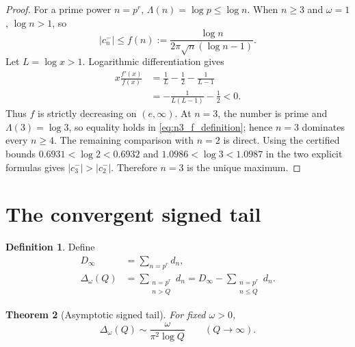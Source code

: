 \documentclass[11pt]{amsart}
\numberwithin{equation}{section}
\theoremstyle{plain}
\newtheorem{theorem}{Theorem}[section]
\theoremstyle{definition}
\newtheorem{definition}[theorem]{Definition}
\theoremstyle{remark}
\newcommand{\1}{\mathbf{1}}
\begin{document}
\begin{proof}
For a prime power \(n=p^r\), \(\Lambda(n)=\log p\leq\log n\).  When
\(n\geq3\) and \(\omega=1\), \(\log n>1\), so
\begin{equation}
|c_n^-|
\leq
f(n)
:=
\frac{\log n}{2\pi\sqrt n(\log n-1)}.
\label{eq:n3_f_definition}
\end{equation}
Let \(L=\log x>1\).  Logarithmic differentiation gives
\begin{align}
x\frac{f'(x)}{f(x)}
&=
\frac1L-\frac12-\frac1{L-1}
\label{eq:n3_log_derivative_one}
\\
&=
-\frac1{L(L-1)}-\frac12<0.
\label{eq:n3_log_derivative_two}
\end{align}
Thus \(f\) is strictly decreasing on \((e,\infty)\).  At \(n=3\), the
number is prime and \(\Lambda(3)=\log3\), so equality holds in
\eqref{eq:n3_f_definition}; hence \(n=3\) dominates every \(n\geq4\).
The remaining comparison with \(n=2\) is direct.  Using the certified
bounds \(0.6931<\log2<0.6932\) and
\(1.0986<\log3<1.0987\) in the two explicit formulas gives
\(|c_3^-|>|c_2^-|\).  Therefore \(n=3\) is the unique maximum.
\end{proof}

\section{The convergent signed tail}
\label{sec:signed_tail}

\begin{definition}
\label{def:Delta}
Define
\begin{align}
D_\infty
&=
\sum_{n=p^r}d_n,
\label{eq:D_infinity}
\\
\Delta_\omega(Q)
&=
\sum_{\substack{n=p^r\\n>Q}}d_n
=
D_\infty-\sum_{\substack{n=p^r\\n\leq Q}}d_n.
\label{eq:Delta_definition}
\end{align}
\end{definition}

\begin{theorem}[Asymptotic signed tail]
\label{thm:Delta_asymptotic}
For fixed \(\omega>0\),
\begin{equation}
\boxed{
\Delta_\omega(Q)
\sim
\frac{\omega}{\pi^2\log Q}
\qquad(Q\to\infty).
}
\label{eq:Delta_asymptotic}
\end{equation}
\end{theorem}
\end{document}
